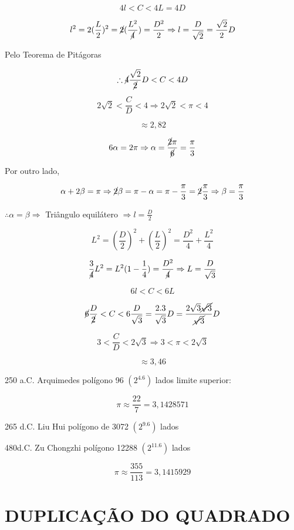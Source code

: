 \documentclass[a4paper, 12pt]{article}
\begin{document}
\[
4l < C < 4L = 4D
\]

\[
l^2 = 2(\frac{L}{2})^2 = \cancel{2}(\frac{L^2}{\cancel{4}}) = \frac{D^2}{2} \Rightarrow l =  \frac{D}{\sqrt{2}} = \frac{\sqrt{2}}{2}D
\]

{Pelo Teorema de Pitágoras}

\[
\therefore \cancel{4} \frac{\sqrt{2}}{\cancel{2}}D < C < 4D
\]

\[
2\sqrt{2} < \frac{C}{D} < 4 \Rightarrow 2\sqrt{2} < \pi < 4
\]

\[
\approx 2,82
\]

\[
6\alpha = 2\pi \Rightarrow \alpha = \frac{\cancel{2}\pi}{\cancel{6}} = \frac{\pi}{3}
\]

{Por outro lado,} 

\[
\alpha + 2 \beta = \pi \Rightarrow \cancel{2}\beta = \pi - \alpha = \pi - \frac{\pi}{3} = \cancel{2}\frac{\pi}{3} \Rightarrow \beta = \frac{\pi}{3}
\]


{$\therefore \alpha = \beta \Rightarrow$ Triângulo equilátero $\Rightarrow l= \frac{D}{2}$}


\[
L^2 = (\frac{D}{2})^2 + (\frac{L}{2})^2 = \frac{D^2}{4} + \frac{L^2}{4}
\]

\[
\frac{3}{\cancel{4}}L^2 = L^2 (1-\frac{1}{4}) = \frac{D^2}{\cancel{4}} \Rightarrow L = \frac{D}{\sqrt{3}}
\]

\[
6l < C < 6L
\]

\[
\cancel{6}\frac{D}{\cancel{2}} < C < 6\frac{D}{\sqrt{3}} = \frac{2.3}{\sqrt{3}}D = \frac{2\sqrt{3}\cancel{\sqrt{3}}}{\cancel{\sqrt{3}}}D
\]

\[
3 < \frac{C}{D} < 2\sqrt{3} \Rightarrow 3 < \pi < 2\sqrt{3}
\]

\[
\approx 3,46
\] 

{250 a.C. Arquimedes polígono 96 $(2^4.6)$ lados limite superior:}

\[
\pi \approx \frac{22}{7} = 3,1428571
\]

{265 d.C. Liu Hui polígono de 3072 $(2^9.6)$ lados}

{480d.C. Zu Chongzhi polígono 12288 $(2^11.6)$ lados}

\[
\pi \approx \frac{355}{113} = 3,1415929
\]
\section{DUPLICAÇÃO DO QUADRADO}
\end{document}

